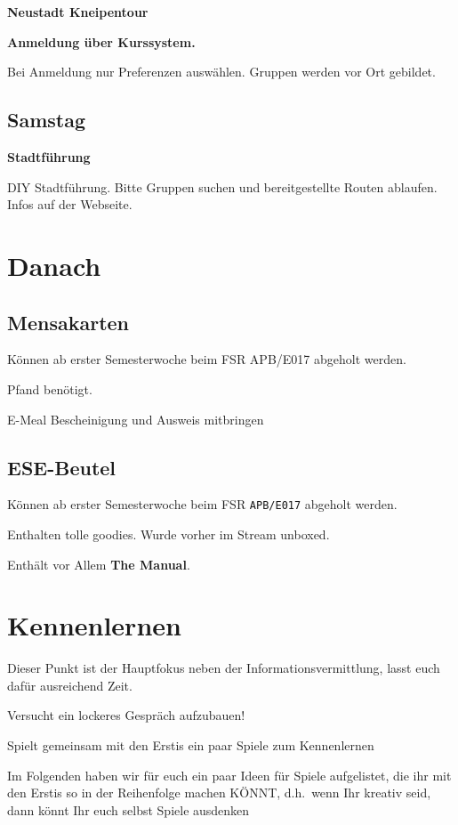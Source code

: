 \documentclass[a4paper,12pt]{scrreprt}
\begin{document}
\textbf{Neustadt Kneipentour}
\begin{itemize*}
    \item \textbf{Anmeldung über Kurssystem.}
    \item Bei Anmeldung nur Preferenzen auswählen. Gruppen werden vor Ort gebildet.
\end{itemize*}


\subsection{Samstag}

\textbf{Stadtführung}
\begin{itemize*}
    \item DIY Stadtführung. Bitte Gruppen suchen und bereitgestellte Routen ablaufen. Infos auf der Webseite.
\end{itemize*}

\section{Danach}
\subsection{Mensakarten}
\begin{itemize*}
    \item Können ab erster Semesterwoche beim FSR APB/E017 abgeholt werden.
    \item {} Pfand benötigt.
    \item E-Meal Bescheinigung und Ausweis mitbringen
\end{itemize*}

\subsection{ESE-Beutel}
\begin{itemize*}
    \item Können ab erster Semesterwoche beim FSR \texttt{APB/E017} abgeholt werden.
    \item Enthalten tolle goodies. Wurde vorher im Stream unboxed.
    \item Enthält vor Allem \textbf{The Manual}.
\end{itemize*}


\section{Kennenlernen}
\begin{itemize*}
    \item Dieser Punkt ist der Hauptfokus neben der Informationsvermittlung, lasst euch dafür ausreichend Zeit.
    \item Versucht ein lockeres Gespräch aufzubauen!
    \item Spielt gemeinsam mit den Erstis ein paar Spiele zum Kennenlernen
    \item Im Folgenden haben wir für euch ein paar Ideen für Spiele aufgelistet, die ihr mit den Erstis so in der Reihenfolge machen KÖNNT, d.h.\ wenn Ihr kreativ seid, dann könnt Ihr euch selbst Spiele ausdenken
\end{itemize*}
\end{document}
